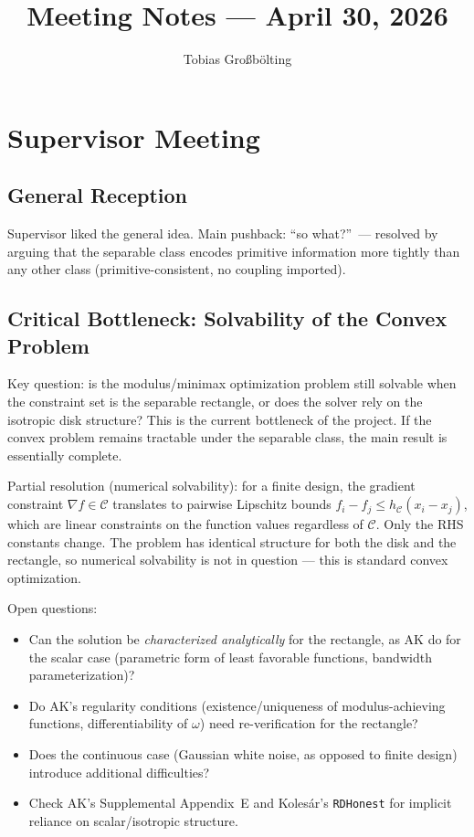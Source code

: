 \documentclass[12pt,a4paper]{article}
\author{Tobias Großbölting}
\title{Meeting Notes --- April 30, 2026}
\begin{document}
\maketitle

\section*{Supervisor Meeting}

\subsection*{General Reception}
Supervisor liked the general idea. Main pushback: ``so what?''\ --- resolved by arguing that the separable class encodes primitive information more tightly than any other class (primitive-consistent, no coupling imported).

\subsection*{Critical Bottleneck: Solvability of the Convex Problem}
Key question: is the modulus/minimax optimization problem still solvable when the constraint set is the separable rectangle, or does the solver rely on the isotropic disk structure?
This is the current bottleneck of the project. If the convex problem remains tractable under the separable class, the main result is essentially complete.

Partial resolution (numerical solvability): for a finite design, the gradient constraint $\nabla f \in \mathcal{C}$ translates to pairwise Lipschitz bounds $f_i - f_j \leq h_{\mathcal{C}}(x_i - x_j)$, which are linear constraints on the function values regardless of $\mathcal{C}$. Only the RHS constants change. The problem has identical structure for both the disk and the rectangle, so numerical solvability is not in question --- this is standard convex optimization.

Open questions:
\begin{itemize}
	\item Can the solution be \emph{characterized analytically} for the rectangle, as AK do for the scalar case (parametric form of least favorable functions, bandwidth parameterization)?
	\item Do AK's regularity conditions (existence/uniqueness of modulus-achieving functions, differentiability of $\omega$) need re-verification for the rectangle?
	\item Does the continuous case (Gaussian white noise, as opposed to finite design) introduce additional difficulties?
	\item Check AK's Supplemental Appendix~E and Kolesár's \texttt{RDHonest} for implicit reliance on scalar/isotropic structure.
\end{itemize}
\end{document}
